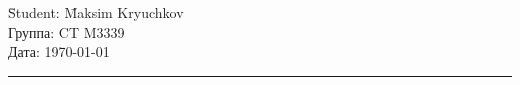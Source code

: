 \begin{tabbing}
\hspace{11cm} \= Student: \= Maksim Kryuchkov \\
  \> Группа: \> CT M3339 \\
  \> Дата: \> \today
\end{tabbing}
\hrule
\vspace{1cm}

